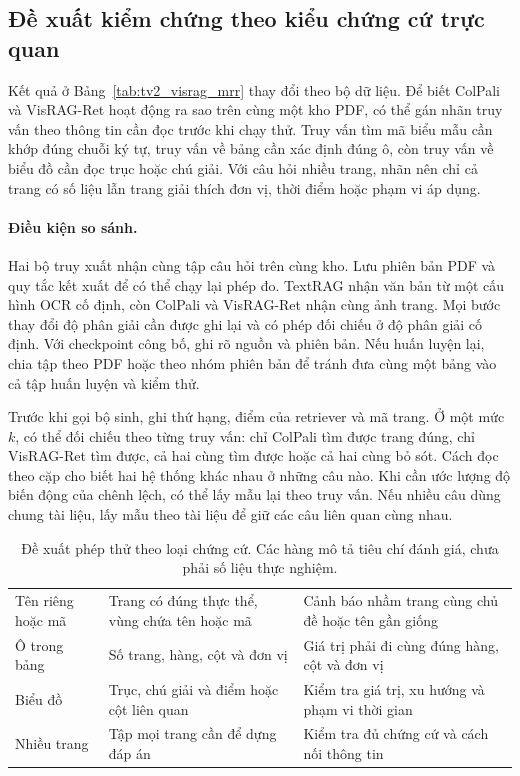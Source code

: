 \subsection{Đề xuất kiểm chứng theo kiểu chứng cứ trực quan}
\label{subsec:tv2_protocol}

Kết quả ở Bảng~\ref{tab:tv2_visrag_mrr} thay đổi theo bộ dữ liệu. Để biết
ColPali và VisRAG-Ret hoạt động ra sao trên cùng một kho PDF, có thể gán
nhãn truy vấn theo thông tin cần đọc trước khi chạy thử. Truy vấn tìm
mã biểu mẫu cần khớp đúng chuỗi ký tự, truy vấn về bảng cần xác định
đúng ô, còn truy vấn về biểu đồ cần đọc trục hoặc chú giải. Với câu hỏi
nhiều trang, nhãn nên chỉ cả trang có số liệu lẫn trang giải thích đơn
vị, thời điểm hoặc phạm vi áp dụng.

\paragraph{Điều kiện so sánh.}
Hai bộ truy xuất nhận cùng tập câu hỏi trên cùng kho. Lưu phiên bản
PDF và quy tắc kết xuất để có thể chạy lại phép đo. TextRAG nhận văn
bản từ một cấu hình OCR cố định, còn ColPali và VisRAG-Ret nhận cùng
ảnh trang. Mọi bước thay đổi độ phân giải cần được ghi lại và có phép
đối chiếu ở độ phân giải cố định. Với checkpoint công bố, ghi rõ nguồn
và phiên bản. Nếu huấn luyện lại, chia tập theo PDF hoặc theo nhóm phiên
bản để tránh đưa cùng một bảng vào cả tập huấn luyện và kiểm thử.

Trước khi gọi bộ sinh, ghi thứ hạng, điểm của retriever và mã trang.
Ở một mức $k$, có thể đối chiếu theo từng truy vấn: chỉ ColPali tìm
được trang đúng, chỉ VisRAG-Ret tìm được, cả hai cùng tìm được hoặc
cả hai cùng bỏ sót. Cách đọc theo cặp cho biết hai hệ thống khác nhau
ở những câu nào. Khi cần ước lượng độ biến động của chênh lệch, có thể
lấy mẫu lại theo truy vấn. Nếu nhiều câu dùng chung tài liệu, lấy mẫu
theo tài liệu để giữ các câu liên quan cùng nhau.

\begin{table}[htbp]
\centering
\small
\caption[Đối chứng theo loại chứng cứ trong tài liệu]{Đề xuất phép thử theo loại chứng cứ. Các hàng mô tả tiêu chí đánh giá, chưa phải số liệu thực nghiệm.}
\label{tab:tv2_protocol_types}
\renewcommand{\arraystretch}{1.18}
\begin{tabularx}{\textwidth}{@{}P{3.0cm}L L@{}}
\toprule
{}
 &  &  \\
\midrule
Tên riêng hoặc mã & Trang có đúng thực thể, vùng chứa tên hoặc mã & Cảnh báo nhầm trang cùng chủ đề hoặc tên gần giống \\
Ô trong bảng & Số trang, hàng, cột và đơn vị & Giá trị phải đi cùng đúng hàng, cột và đơn vị \\
Biểu đồ & Trục, chú giải và điểm hoặc cột liên quan & Kiểm tra giá trị, xu hướng và phạm vi thời gian \\
Nhiều trang & Tập mọi trang cần để dựng đáp án & Kiểm tra đủ chứng cứ và cách nối thông tin \\
\bottomrule
\end{tabularx}
\end{table}

